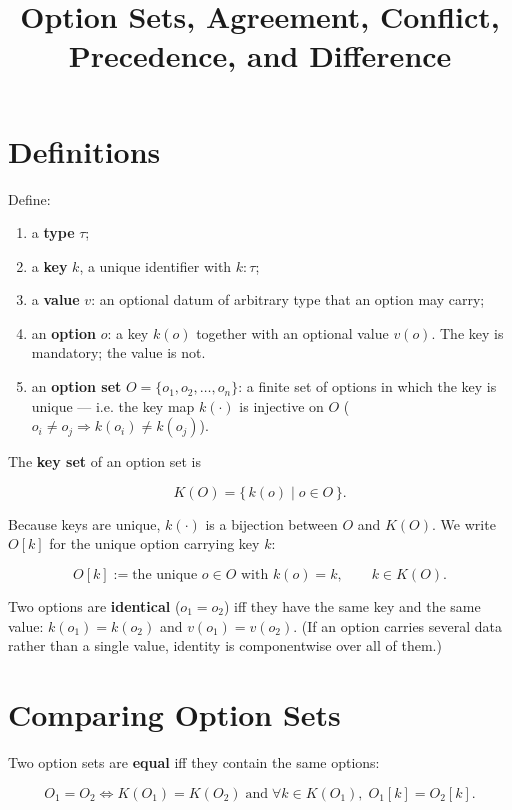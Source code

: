 \documentclass[11pt]{article}
\title{Option Sets, Agreement, Conflict, Precedence, and Difference}
\author{}
\date{}
\begin{document}
\maketitle

\section{Definitions}

Define:

\begin{enumerate}[label=\arabic*.]
    \item a \textbf{type} \(\tau\);
    \item a \textbf{key} \(k\), a unique identifier with \(k : \tau\);
    \item a \textbf{value} \(v\): an optional datum of arbitrary type that an option may carry;
    \item an \textbf{option} \(o\): a key \(k(o)\) together with an optional value \(v(o)\). The key is mandatory; the value is not.
    \item an \textbf{option set} \(O = \{o_1, o_2, \ldots, o_n\}\): a finite set of options in which the key is unique --- i.e. the key map \(k(\cdot)\) is injective on \(O\) (\(o_i \neq o_j \Rightarrow k(o_i) \neq k(o_j)\)).
\end{enumerate}

The \textbf{key set} of an option set is

\[
K(O) = \{\, k(o) \mid o \in O \,\}.
\]

Because keys are unique, \(k(\cdot)\) is a bijection between \(O\) and \(K(O)\). We write \(O[k]\) for the unique option carrying key \(k\):

\[
O[k] := \text{the unique } o \in O \text{ with } k(o) = k,
\qquad k \in K(O).
\]

Two options are \textbf{identical} (\(o_1 = o_2\)) iff they have the same key and the same value:
\(k(o_1) = k(o_2)\) and \(v(o_1) = v(o_2)\). (If an option carries several data rather than a single value, identity is componentwise over all of them.)

\section{Comparing Option Sets}

Two option sets are \textbf{equal} iff they contain the same options:

\[
O_1 = O_2
\iff
K(O_1) = K(O_2)
\;\text{and}\;
\forall k \in K(O_1),\; O_1[k] = O_2[k].
\]
\end{document}
